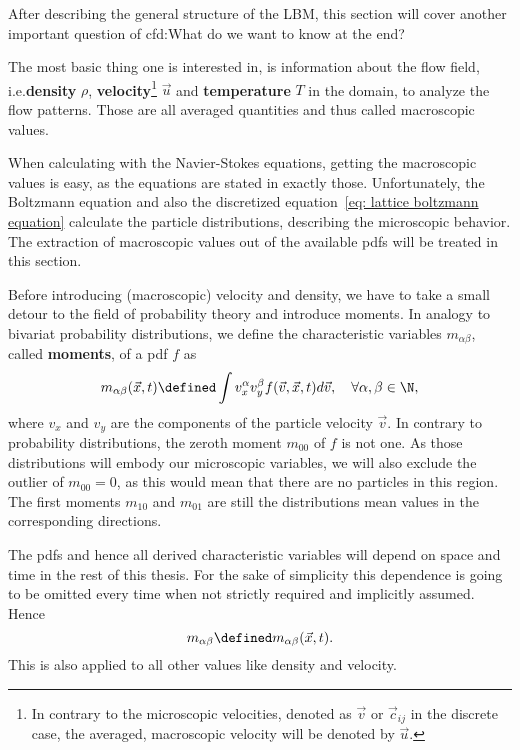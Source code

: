 After describing the general structure of the LBM, this section will cover another important question of \gls{cfd}:\@ What do we want to know at the end?

The most basic thing one is interested in, is information about the flow field, i.e.\@ \textbf{density} $\rho$, \textbf{velocity}\footnote{In contrary to the microscopic velocities, denoted as $\vec{v}$ or $\vec{c}_{ij}$ in the discrete case, the averaged, macroscopic velocity will be denoted by $\vec{u}$.} $\vec{u}$ and \textbf{temperature} $T$ in the domain, to analyze the flow patterns.
Those are all averaged quantities and thus called macroscopic values.

When calculating with the Navier-Stokes equations, getting the macroscopic values is easy, as the equations are stated in exactly those.
Unfortunately, the Boltzmann equation and also the discretized equation~\eqref{eq: lattice boltzmann equation} calculate the particle distributions, describing the microscopic behavior.
The extraction of macroscopic values out of the available \glspl{pdf} will be treated in this section.

Before introducing (macroscopic) velocity and density, we have to take a small detour to the field of probability theory and introduce moments.
In analogy to bivariat probability distributions, we define the characteristic variables $m_{\alpha\beta}$, called \textbf{moments}, of a \gls{pdf} $f$ as
\begin{equation}
  \label{eq: moments continuous}
  m_{\alpha\beta}(\vec{x},t) \defined  \int v_x^\alpha v_y^\beta f(\vec{v},\vec{x},t) d\vec{v},\quad\forall\alpha,\beta\in\N,
\end{equation}
where $v_x$ and $v_y$ are the components of the particle velocity $\vec{v}$.
In contrary to probability distributions, the zeroth moment $m_{00}$ of $f$ is not one.
As those distributions will embody our microscopic variables, we will also exclude the outlier of $m_{00}=0$, as this would mean that there are no particles in this region.
The first moments $m_{10}$ and $m_{01}$ are still the distributions mean values in the corresponding directions.

The \glspl{pdf} and hence all derived characteristic variables will depend on space and time in the rest of this thesis.
For the sake of simplicity this dependence is going to be omitted every time when not strictly required and implicitly assumed. Hence
\begin{equation}
  \label{eq: leave out x and y}
  m_{\alpha\beta} \defined m_{\alpha\beta}(\vec{x},t).
\end{equation}
This is also applied to all other values like density and velocity.


